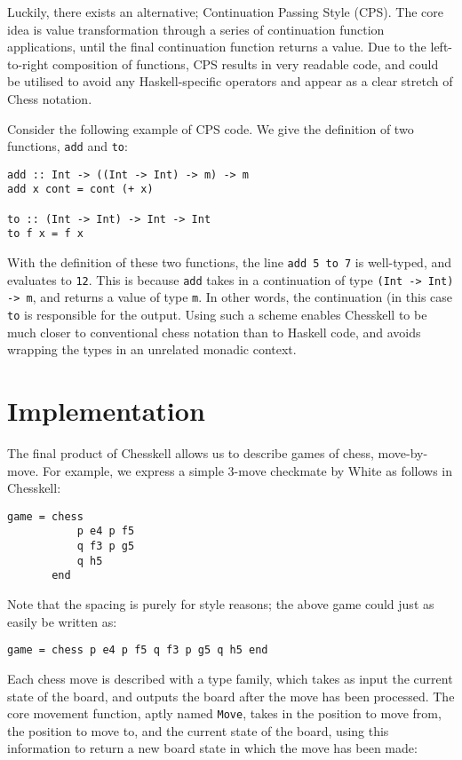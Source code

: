 \documentclass[12pt, a4paper, bibliography=totocnumbered]{scrreprt}
\newcommand{\inline}[1]{\lstinline[basicstyle=\ttfamily\footnotesize]{#1}}
\begin{document}
Luckily, there exists an alternative; Continuation Passing Style (CPS). The core idea is value transformation through a series of continuation function applications, until the final continuation function returns a value. Due to the left-to-right composition of functions, CPS results in very readable code, and could be utilised to avoid any Haskell-specific operators and appear as a clear stretch of Chess notation.

Consider the following example of CPS code. We give the definition of two functions, \inline{add} and \inline{to}:

\begin{lstlisting}
add :: Int -> ((Int -> Int) -> m) -> m
add x cont = cont (+ x)

to :: (Int -> Int) -> Int -> Int
to f x = f x
\end{lstlisting}

With the definition of these two functions, the line \inline{add 5 to 7} is well-typed, and evaluates to \inline{12}. This is because \inline{add} takes in a continuation of type \inline{(Int -> Int) -> m}, and returns a value of type \inline{m}. In other words, the continuation (in this case \inline{to} is responsible for the output. Using such a scheme enables Chesskell to be much closer to conventional chess notation than to Haskell code, and avoids wrapping the types in an unrelated monadic context.


\chapter{Implementation} \label{examplegame}

The final product of Chesskell allows us to describe games of chess, move-by-move. For example, we express a simple 3-move checkmate by White as follows in Chesskell:

\begin{lstlisting}
game = chess
           p e4 p f5
           q f3 p g5
           q h5
       end
\end{lstlisting}

Note that the spacing is purely for style reasons; the above game could just as easily be written as:

\begin{lstlisting}
game = chess p e4 p f5 q f3 p g5 q h5 end
\end{lstlisting}

Each chess move is described with a type family, which takes as input the current state of the board, and outputs the board after the move has been processed. The core movement function, aptly named \inline{Move}, takes in the position to move from, the position to move to, and the current state of the board, using this information to return a new board state in which the move has been made:
\end{document}
